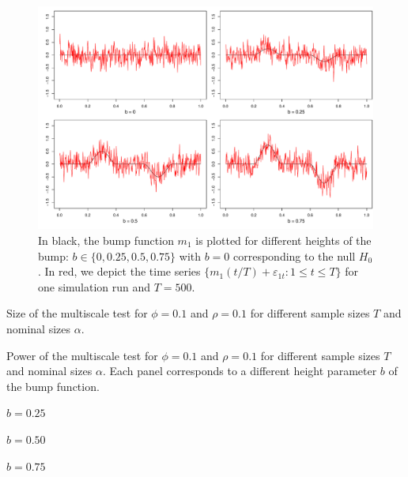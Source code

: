\documentclass[12pt]{article}
\begin{document}
\begin{figure}[t!]
\includegraphics[width=\textwidth]{../output/bump_function.pdf}
\caption{In black, the bump function $m_1$ is plotted for different heights of the bump: $b \in \{0, 0.25, 0.5, 0.75\}$ with $b=0$ corresponding to the null $H_0$. In red, we depict the time series $\{m_1(t/T) + \varepsilon_{1t}: 1 \le t \le T\}$ for one simulation run and $T=500$.}\label{fig:bump_function}

\end{figure}

\begin{table}[t]
\footnotesize{
\begin{center}
\caption{Size of the multiscale test for $\phi = 0.1$ and $\rho = 0.1$ for different sample sizes $T$ and nominal sizes $\alpha$.}
\label{tab:size1}
\renewcommand{\arraystretch}{1.2}

\end{center}}
\footnotesize{
\begin{center}
\caption{Power of the multiscale test for $\phi = 0.1$ and $\rho = 0.1$ for different sample sizes $T$ and nominal sizes $\alpha$. Each panel corresponds to a different height parameter $b$ of the bump function.}\label{tab:power1}
\begin{subtable}[b]{0.32\textwidth}
\centering
\caption{$b = 0.25$}\label{tab:power1_025}
\renewcommand{\arraystretch}{1.2}

\end{subtable}
\begin{subtable}[b]{0.32\textwidth}
\centering
\caption{$b = 0.50$}\label{tab:power1_050}
\renewcommand{\arraystretch}{1.2}

\end{subtable}
\begin{subtable}[b]{0.32\textwidth}
\centering
\caption{$b = 0.75$}\label{tab:power1_075}
\renewcommand{\arraystretch}{1.2}

\end{subtable}
\end{center}}
\vspace{-0.4cm}
\end{table}
\end{document}
